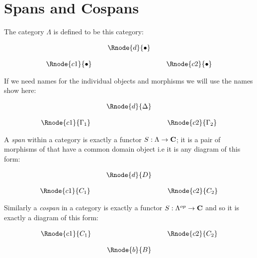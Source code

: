\documentclass[10pt,a4paper]{scrartcl}
\begin{document}
\section{Spans and Cospans}
\noindent
The category $\Lambda$ is defined to be this category:
\begin{center}
\begin{displaymath}
\begin{array}{cp{0.1cm}cp{0.1cm} c}
            & &\Rnode{d}{\bullet}                  \\ [0.4cm]
\Rnode{c1}{\bullet}& &                & & \Rnode{c2}{\bullet} 
\end{array}
\end{displaymath}
\end{center}

\noindent
If we need names for the individual objects and morphisms we will use the names show here:
\begin{center}
\begin{displaymath}
\begin{array}{cp{0.1cm}cp{0.1cm} c}
            & &\Rnode{d}{\Delta}                  \\ [0.4cm]
\Rnode{c1}{\Gamma_1}& &                & & \Rnode{c2}{\Gamma_2} 
\end{array}
\end{displaymath}
\end{center}

\noindent
A \textit{span} within a category  is exactly a functor 
$S: \Lambda \rightarrow \textbf{C}$; it is a pair of morphisms of  that have a common domain object i.e it is any diagram of this form:

\begin{center}
\begin{equation}
\label{genericspan}
\begin{array}{cp{0.1cm}cp{0.1cm} c}
            & &\Rnode{d}{D}                  \\ [0.4cm]
\Rnode{c1}{C_1}& &                & & \Rnode{c2}{C_2} 
\end{array}
\end{equation}
\end{center}

\noindent Similarly a \textit{cospan} in a category  is exactly a functor $S: \Lambda^{op} \rightarrow \textbf{C}$ and so it is exactly a diagram of this form:
\begin{center}
\begin{equation}
\label{genericcospan}
\begin{array}{cp{0.1cm}cp{0.1cm} c}
\Rnode{c1}{C_1}& &                & & \Rnode{c2}{C_2} \\ [0.4cm]
            & &\Rnode{b}{B}
\end{array}
\end{equation}
\end{center}
\end{document}
